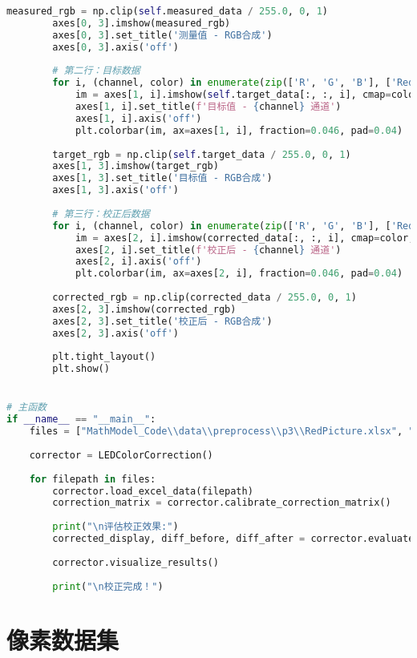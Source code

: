 \begin{lstlisting}[language=Python]
        measured_rgb = np.clip(self.measured_data / 255.0, 0, 1)
        axes[0, 3].imshow(measured_rgb)
        axes[0, 3].set_title('测量值 - RGB合成')
        axes[0, 3].axis('off')
        
        # 第二行：目标数据
        for i, (channel, color) in enumerate(zip(['R', 'G', 'B'], ['Reds', 'Greens', 'Blues'])):
            im = axes[1, i].imshow(self.target_data[:, :, i], cmap=color, vmin=0, vmax=255)
            axes[1, i].set_title(f'目标值 - {channel} 通道')
            axes[1, i].axis('off')
            plt.colorbar(im, ax=axes[1, i], fraction=0.046, pad=0.04)
        
        target_rgb = np.clip(self.target_data / 255.0, 0, 1)
        axes[1, 3].imshow(target_rgb)
        axes[1, 3].set_title('目标值 - RGB合成')
        axes[1, 3].axis('off')
        
        # 第三行：校正后数据
        for i, (channel, color) in enumerate(zip(['R', 'G', 'B'], ['Reds', 'Greens', 'Blues'])):
            im = axes[2, i].imshow(corrected_data[:, :, i], cmap=color, vmin=0, vmax=255)
            axes[2, i].set_title(f'校正后 - {channel} 通道')
            axes[2, i].axis('off')
            plt.colorbar(im, ax=axes[2, i], fraction=0.046, pad=0.04)
        
        corrected_rgb = np.clip(corrected_data / 255.0, 0, 1)
        axes[2, 3].imshow(corrected_rgb)
        axes[2, 3].set_title('校正后 - RGB合成')
        axes[2, 3].axis('off')
        
        plt.tight_layout()
        plt.show()


# 主函数
if __name__ == "__main__":
    files = ["MathModel_Code\\data\\preprocess\\p3\\RedPicture.xlsx", "MathModel_Code\\data\\preprocess\\p3\\GreenPicture.xlsx", "MathModel_Code\\data\\preprocess\\p3\\BluePicture.xlsx"]
    
    corrector = LEDColorCorrection()
    
    for filepath in files:
        corrector.load_excel_data(filepath)
        correction_matrix = corrector.calibrate_correction_matrix()
        
        print("\n评估校正效果:")
        corrected_display, diff_before, diff_after = corrector.evaluate_correction()
        
        corrector.visualize_results()
        
        print("\n校正完成！")
\end{lstlisting}

\newpage
\section[\hspace{-2pt}像素数据集]{{\heiti{} \hspace{-8pt}像素数据集}}

